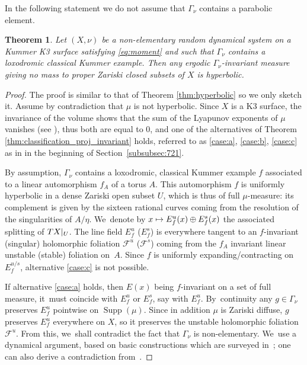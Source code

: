 \documentclass[JEP,XML,SOM,Unicode,published]{cedram}
\newcommand\mto{\mathchoice{\longmapsto}{\mapsto}{\mapsto}{\mapsto}}
\newcommand{\rest}[1]{ \arrowvert_{#1}}
\DeclareMathOperator{\supp}{Supp}
\theoremstyle{plain}
\newtheorem{thm}{Theorem}[section]
\theoremstyle{definition}
\begin{document}
In the following statement we do not assume that $\Gamma_\nu$ contains a parabolic element.

\begin{thm} \label{thm:hyperbolic_kummer}
Let $(X, \nu)$ be a non-elementary random dynamical system on a Kummer K3 surface satisfying
\eqref{eq:moment} and such that $\Gamma_\nu$ contains a loxodromic classical Kummer example. Then
any ergodic $\Gamma_\nu$-invariant
measure giving no mass to proper Zariski closed subsets of $X$ is hyperbolic.
\end{thm}

\begin{proof}
The proof is similar to that of Theorem \ref{thm:hyperbolic} so we only sketch it. Assume by contradiction that $\mu$ is
not hyperbolic. Since $X$ is a K3 surface, the invariance of the volume
shows that the sum of the Lyapunov exponents of $\mu$ vanishes (see \cite[\S 7.3]{stiffness}), thus both are
equal to $0$, and one of the alternatives of Theorem \ref{thm:classification_proj_invariant} holds, referred to as \eqref{case:a}, \eqref{case:b}, \eqref{case:c} as in in the beginning of Section~\ref{subsubsec:721}.

By assumption, $\Gamma_\nu$ contains a loxodromic, classical Kummer example $f$ associated to a linear automorphism $f_A$ of a torus $A$. This automorphism $f$ is uniformly
hyperbolic in a dense Zariski open subset $U$, which is thus of full $\mu$-measure: its complement is given by the sixteen rational curves
coming from the resolution of the singularities of $A/\eta$. We~denote by $x\mto E^u_f(x)\oplus E^s_f(x)$
the associated splitting of $TX\rest{U}$. The line field $E^u_f$ (\resp $E^s_f$) is everywhere tangent
to an $f$-invariant (singular) holomorphic foliation $\mathcal F^u$ (\resp $\mathcal F^s$) coming from the $f_A$ invariant linear unstable (\resp stable) foliation on~$A$.
Since $f$ is uniformly expanding/contracting on $E^{u/s}_f$, alternative \eqref{case:c} is not possible.

If alternative \eqref{case:a} holds, then $E(x)$ being $f$-invariant on a set of full
measure, it~must coincide with $E^u_f$ or $E^s_f$, say with $E^u_f$. By~continuity any $g\in \Gamma_\nu$ preserves
$E^u_f$ pointwise on $\supp(\mu)$.
Since in addition $\mu$ is Zariski diffuse, $g$
preserves $E^u_f$ everywhere on $X$, so it
preserves the unstable holomorphic foliation $\mathcal F^u$.
From this, we~shall contradict
the fact that $\Gamma_\nu$ is non-elementary. We~use a dynamical argument, based on basic constructions which are surveyed in~\cite{Cantat:Milnor}; one can also derive a contradiction from~\cite{Cantat-Favre}.


\end{proof}
\end{document}
